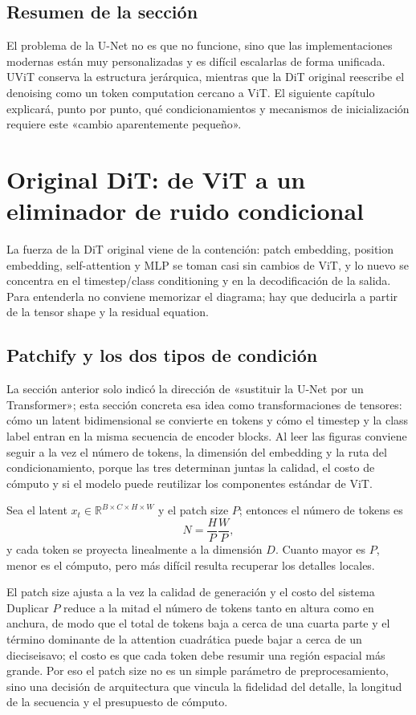 \documentclass[a4paper]{article}
\begin{document}
\subsection{Resumen de la sección}

El problema de la U-Net no es que no funcione, sino que las implementaciones modernas están muy personalizadas y es difícil escalarlas de forma unificada. UViT conserva la estructura jerárquica, mientras que la DiT original reescribe el denoising como un token computation cercano a ViT. El siguiente capítulo explicará, punto por punto, qué condicionamientos y mecanismos de inicialización requiere este «cambio aparentemente pequeño».
\section{Original DiT: de ViT a un eliminador de ruido condicional}

La fuerza de la DiT original viene de la contención: patch embedding, position embedding, self-attention y MLP se toman casi sin cambios de ViT, y lo nuevo se concentra en el timestep/class conditioning y en la decodificación de la salida. Para entenderla no conviene memorizar el diagrama; hay que deducirla a partir de la tensor shape y la residual equation.

\subsection{Patchify y los dos tipos de condición}

La sección anterior solo indicó la dirección de «sustituir la U-Net por un Transformer»; esta sección concreta esa idea como transformaciones de tensores: cómo un latent bidimensional se convierte en tokens y cómo el timestep y la class label entran en la misma secuencia de encoder blocks. Al leer las figuras conviene seguir a la vez el número de tokens, la dimensión del embedding y la ruta del condicionamiento, porque las tres determinan juntas la calidad, el costo de cómputo y si el modelo puede reutilizar los componentes estándar de ViT.

Sea el latent $x_t\in\mathbb R^{B\times C\times H\times W}$ y el patch size $P$; entonces el número de tokens es
\[
N=\frac{H}{P}\frac{W}{P},
\]
y cada token se proyecta linealmente a la dimensión $D$. Cuanto mayor es $P$, menor es el cómputo, pero más difícil resulta recuperar los detalles locales.

\begin{knowledgebox}{El patch size ajusta a la vez la calidad de generación y el costo del sistema}
Duplicar $P$ reduce a la mitad el número de tokens tanto en altura como en anchura, de modo que el total de tokens baja a cerca de una cuarta parte y el término dominante de la attention cuadrática puede bajar a cerca de un dieciseisavo; el costo es que cada token debe resumir una región espacial más grande. Por eso el patch size no es un simple parámetro de preprocesamiento, sino una decisión de arquitectura que vincula la fidelidad del detalle, la longitud de la secuencia y el presupuesto de cómputo.
\end{knowledgebox}
\end{document}
